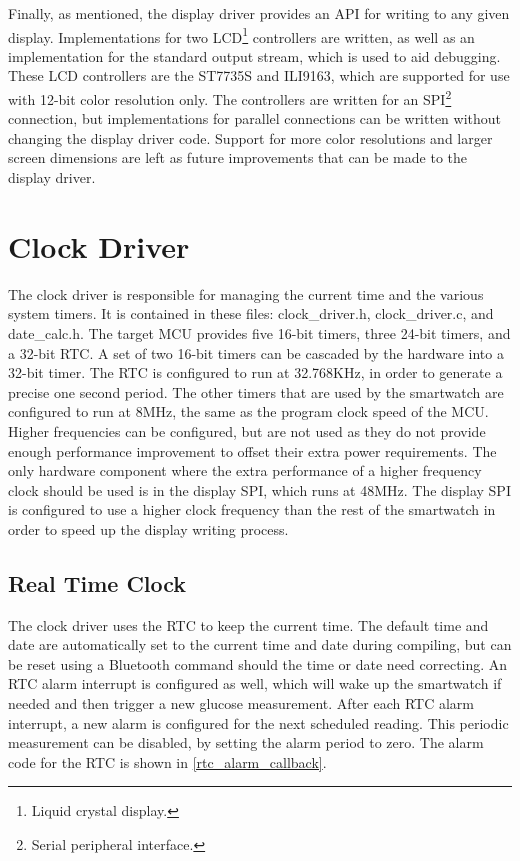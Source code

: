 Finally, as mentioned, the display driver provides an API for writing to any given display. Implementations for two LCD\footnote{Liquid crystal display.} controllers are written, as well as an implementation for the standard output stream, which is used to aid debugging. These LCD controllers are the ST7735S\cite{ST7735S} and ILI9163\cite{ILI9163}, which are supported for use with 12-bit color resolution only. The controllers are written for an SPI\footnote{Serial peripheral interface.} connection, but implementations for parallel connections can be written without changing the display driver code. Support for more color resolutions and larger screen dimensions are left as future improvements that can be made to the display driver.

\nl

\section{Clock Driver}
The clock driver is responsible for managing the current time and the various system timers. It is contained in these files: clock\_driver.h, clock\_driver.c, and date\_calc.h. The target MCU provides five 16-bit timers, three 24-bit timers, and a 32-bit RTC. A set of two 16-bit timers can be cascaded by the hardware into a 32-bit timer. The RTC is configured to run at 32.768KHz, in order to generate a precise one second period. The other timers that are used by the smartwatch are configured to run at 8MHz, the same as the program clock speed of the MCU. Higher frequencies can be configured, but are not used as they do not provide enough performance improvement to offset their extra power requirements. The only hardware component where the extra performance of a higher frequency clock should be used is in the display SPI, which runs at 48MHz. The display SPI is configured to use a higher clock frequency than the rest of the smartwatch in order to speed up the display writing process.

\subsection{Real Time Clock}
The clock driver uses the RTC to keep the current time. The default time and date are automatically set to the current time and date during compiling, but can be reset using a Bluetooth command should the time or date need correcting. An RTC alarm interrupt is configured as well, which will wake up the smartwatch if needed and then trigger a new glucose measurement. After each RTC alarm interrupt, a new alarm is configured for the next scheduled reading. This periodic measurement can be disabled, by setting the alarm period to zero. The alarm code for the RTC is shown in \ref{rtc_alarm_callback}.

